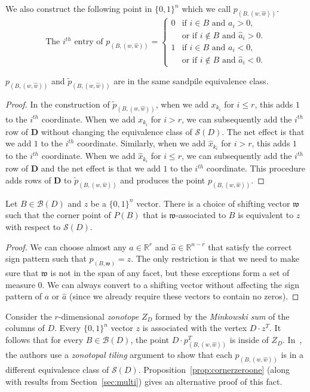 \documentclass[ALCO,ThmDefs,Unicode,epreuves]{cedram}
\renewcommand{\tilde}{\widetilde}
\newcommand{\R}{\mathbb{R}}
\newcommand{\D}{\mathbf{D}}
\newcommand{\B}{\mathcal{B}}
\newcommand{\Sand}{\mathcal{S}}
\newcommand{\what}{\widehat}
\newcommand{\colB}[1]{x_{k_{#1}}}
\newcommand{\hcolB}[1]{\widehat x_{k_{#1}}}
\newcommand{\w}{\mathfrak w}
\begin{document}
We also construct the following point in $\{0,1\}^n$ which we call $p_{(B,(w,\what w))}$. 
\[
\text{The } i^{th} \text{ entry of }p_{(B,(w,\what w))}= \begin{cases} 0 & \text{if } i \in B \text{ and } a_i > 0,\\
& \text{or if } i \not\in B \text{ and } \widehat a_i > 0.\\
1 & \text{if } i \in B \text{ and } a_i < 0,\\
& \text{or if } i \not\in B \text{ and } \widehat a_i < 0.
\end{cases}
\]

\begin{prop}\label{prop:cornerzeroone}
$p_{(B,(w,\what w))}$ and $\tilde p_{(B,(w,\what w))}$ are in the same sandpile equivalence class. 
\end{prop}
\begin{proof}
In the construction of $\tilde p_{(B,(w,\widehat w))}$, when we add $\colB i$ for $i \le r$, this adds $1$ to the $i^{th}$ coordinate. When we add $\colB i$ for $i > r$, we can subsequently add the $i^{th}$ row of $\D$ without changing the equivalence class of $\Sand(D)$. The net effect is that we add $1$ to the $i^{th}$ coordinate. Similarly, when we add $\hcolB i$ for $i > r$, this adds $1$ to the $i^{th}$ coordinate. When we add $\hcolB i$ for $i\le r$, we can subsequently add the $i^{th}$ row of $\D$ and the net effect is that we add $1$ to the $i^{th}$ coordinate. This procedure adds rows of $\D$ to $\tilde p_{(B,(w,\what w))}$ and produces the point $p_{(B,(w,\widehat w))}$.
\end{proof}

\begin{coro}
Let $B \in \B(D)$ and $z$ be a $\{0,1\}^n$ vector. There is a choice of shifting vector $\w$ such that the corner point of $P(B)$ that is $\w$-associated to $B$ is equivalent to $z$ with respect to $\Sand(D)$. 
\end{coro}
\begin{proof}
We can choose almost any $a\in \R^r$ and $\hat a \in \R^{n-r}$ that satisfy the correct sign pattern such that $p_{(B,\w)} = z$. The only restriction is that we need to make sure that $\w$ is not in the span of any facet, but these exceptions form a set of measure $0$. We can always convert to a shifting vector without affecting the sign pattern of $a$ or $\hat a$ (since we already require these vectors to contain no zeros). 
\end{proof}

\begin{rema}
Consider the $r$-dimensional \emph{zonotope} $Z_D$ formed by the \emph{Minkowski sum} of the columns of $D$. Every $\{0,1\}^n$ vector $z$ is associated with the vertex $D\cdot z^T$. It follows that for every $B \in \mathcal B(D)$, the point $D\cdot p_{(B,(w,\what w))}^T$ is inside of $Z_D$. In~\cite{BBY}, the authors use a \emph{zonotopal tiling} argument to show that each $p_{(B,(w,\what w))}$ is in a different equivalence class of $\Sand(D)$. Proposition~\ref{prop:cornerzeroone} (along with results from Section~\ref{sec:multi}) gives an alternative proof of this fact. 
\end{rema}
\end{document}
